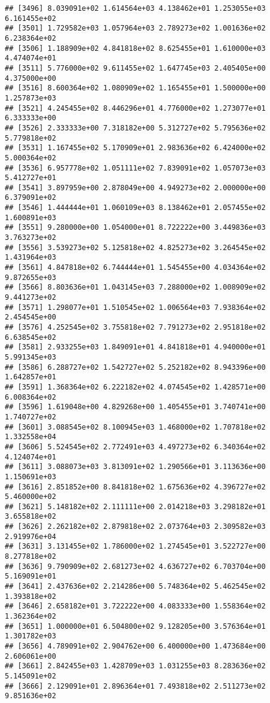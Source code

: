 \documentclass[]{article}
\begin{document}
\begin{verbatim}
## [3496] 8.039091e+02 1.614564e+03 4.138462e+01 1.253055e+03 6.161455e+02
## [3501] 1.729582e+03 1.057964e+03 2.789273e+02 1.001636e+02 6.238364e+02
## [3506] 1.188909e+02 4.841818e+02 8.625455e+01 1.610000e+03 4.474074e+01
## [3511] 5.776000e+02 9.611455e+02 1.647745e+03 2.405405e+00 4.375000e+00
## [3516] 8.600364e+02 1.080909e+02 1.165455e+01 1.500000e+00 1.257873e+03
## [3521] 4.245455e+02 8.446296e+01 4.776000e+02 1.273077e+01 6.333333e+00
## [3526] 2.333333e+00 7.318182e+00 5.312727e+02 5.795636e+02 5.779818e+02
## [3531] 1.167455e+02 5.170909e+01 2.983636e+02 6.424000e+02 5.000364e+02
## [3536] 6.957778e+02 1.051111e+02 7.839091e+02 1.057073e+03 5.412727e+01
## [3541] 3.897959e+00 2.878049e+00 4.949273e+02 2.000000e+00 6.379091e+02
## [3546] 1.444444e+01 1.060109e+03 8.138462e+01 2.057455e+02 1.600891e+03
## [3551] 9.280000e+00 1.054000e+01 8.722222e+00 3.449836e+03 3.763273e+02
## [3556] 3.539273e+02 5.125818e+02 4.825273e+02 3.264545e+02 1.431964e+03
## [3561] 4.847818e+02 6.744444e+01 1.545455e+00 4.034364e+02 9.872655e+03
## [3566] 8.803636e+01 1.043145e+03 7.288000e+02 1.008909e+02 9.441273e+02
## [3571] 1.298077e+01 1.510545e+02 1.006564e+03 7.938364e+02 2.454545e+00
## [3576] 4.252545e+02 3.755818e+02 7.791273e+02 2.951818e+02 6.638545e+02
## [3581] 2.933255e+03 1.849091e+01 4.841818e+01 4.940000e+01 5.991345e+03
## [3586] 6.288727e+02 1.542727e+02 5.252182e+02 8.943396e+00 1.642857e+01
## [3591] 1.368364e+02 6.222182e+02 4.074545e+02 1.428571e+00 6.008364e+02
## [3596] 1.619048e+00 4.829268e+00 1.405455e+01 3.740741e+00 1.740727e+02
## [3601] 3.088545e+02 8.100945e+03 1.468000e+02 1.707818e+02 1.332558e+04
## [3606] 5.524545e+02 2.772491e+03 4.497273e+02 6.340364e+02 4.124074e+01
## [3611] 3.088073e+03 3.813091e+02 1.290566e+01 3.113636e+00 1.150691e+03
## [3616] 2.851852e+00 8.841818e+02 1.675636e+02 4.396727e+02 5.460000e+02
## [3621] 5.148182e+02 2.111111e+00 2.014218e+03 3.298182e+01 3.655818e+02
## [3626] 2.262182e+02 2.879818e+02 2.073764e+03 2.309582e+03 2.919976e+04
## [3631] 3.131455e+02 1.786000e+02 1.274545e+01 3.522727e+00 8.277818e+02
## [3636] 9.790909e+02 2.681273e+02 4.636727e+02 6.703704e+00 5.169091e+01
## [3641] 2.437636e+02 2.214286e+00 5.748364e+02 5.462545e+02 1.393818e+02
## [3646] 2.658182e+01 3.722222e+00 4.083333e+00 1.558364e+02 1.362364e+02
## [3651] 1.000000e+01 6.504800e+02 9.128205e+00 3.576364e+01 1.301782e+03
## [3656] 4.789091e+02 2.904762e+00 6.400000e+00 1.473684e+00 2.606061e+00
## [3661] 2.842455e+03 1.428709e+03 1.031255e+03 8.283636e+02 5.145091e+02
## [3666] 2.129091e+01 2.896364e+01 7.493818e+02 2.511273e+02 9.851636e+02

\end{verbatim}
\end{document}

